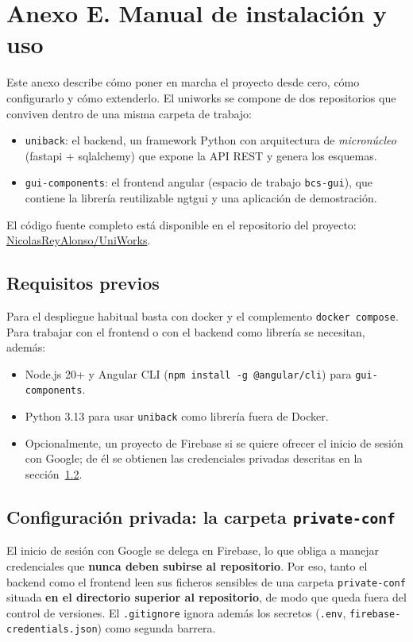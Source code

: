 \section{Anexo E. Manual de instalación y uso}

Este anexo describe cómo poner en marcha el proyecto desde cero, cómo
configurarlo y cómo extenderlo. El \gls{uniworks} se compone de dos
repositorios que conviven dentro de una misma carpeta de trabajo:

\begin{itemize}
  \item \texttt{uniback}: el \gls{backend}, un \gls{framework} Python con
        arquitectura de \emph{micronúcleo} (\gls{fastapi} + \gls{sqlalchemy})
        que expone la API REST y genera los esquemas.
  \item \texttt{gui-components}: el \gls{frontend} \gls{angular} (espacio de
        trabajo \texttt{bcs-gui}), que contiene la librería reutilizable
        \gls{ngtgui} y una aplicación de demostración.
\end{itemize}

El código fuente completo está disponible en el repositorio del proyecto:
\href{https://github.com/NicolasReyAlonso/UniWorks.git}{NicolasReyAlonso/UniWorks}.

\subsection{Requisitos previos}
Para el despliegue habitual basta con \gls{docker} y el complemento
\texttt{docker compose}. Para trabajar con el frontend o con el backend como
librería se necesitan, además:

\begin{itemize}
  \item Node.js 20+ y Angular CLI (\texttt{npm install -g @angular/cli}) para
        \texttt{gui-components}.
  \item Python 3.13 para usar \texttt{uniback} como librería fuera de Docker.
  \item Opcionalmente, un proyecto de Firebase si se quiere ofrecer el inicio
        de sesión con Google; de él se obtienen las credenciales privadas
        descritas en la sección~\ref{sec:privateconf}.
\end{itemize}

\subsection{Configuración privada: la carpeta \texorpdfstring{\texttt{private-conf}}{private-conf}}
\label{sec:privateconf}
El inicio de sesión con Google se delega en Firebase, lo que obliga a manejar
credenciales que \textbf{nunca deben subirse al repositorio}. Por eso, tanto el
backend como el frontend leen sus ficheros sensibles de una carpeta
\texttt{private-conf} situada \textbf{en el directorio superior al
repositorio}, de modo que queda fuera del control de versiones. El
\texttt{.gitignore} ignora además los secretos (\texttt{.env},
\texttt{firebase-\allowbreak credentials.\allowbreak json}) como segunda
barrera.

